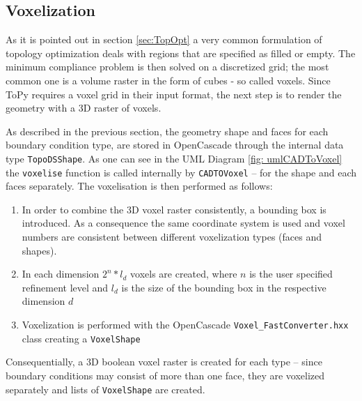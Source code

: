 \subsection{Voxelization}
\label{sec: Voxelization}

As it is pointed out in section \ref{sec:TopOpt} a very common formulation of topology optimization deals with regions that are specified as filled or empty. The minimum compliance problem is then solved on a discretized grid; the most common one is a volume raster in the form of cubes - so called voxels. Since ToPy requires a voxel grid in their input format, the next step is to render the geometry with a 3D raster of voxels.  

As described in the previous section, the geometry shape and faces for each boundary condition type, are stored in OpenCascade through the internal data type \lstinline|TopoDSShape|. As one can see in the UML Diagram \ref{fig: umlCADToVoxel} the \lstinline|voxelise| function is called internally by \lstinline|CADTOVoxel| -- for the shape and each faces separately. The voxelisation is then performed as follows: 
\begin{enumerate}
\item In order to combine the 3D voxel raster consistently, a bounding box is introduced. As a consequence the same coordinate system is used and voxel numbers are consistent between different voxelization types (faces and shapes). 
\item In each dimension $2^n*l_d$ voxels are created, where $n$ is the user specified refinement level and $l_d$ is the size of the bounding box in the respective dimension $d$
\item Voxelization is performed with the OpenCascade  \lstinline|Voxel_FastConverter.hxx| class creating a \lstinline|VoxelShape|
\end{enumerate}

Consequentially, a 3D boolean voxel raster is created for each type -- since boundary conditions may consist of more than one face, they are voxelized separately and lists of \lstinline|VoxelShape| are created. 